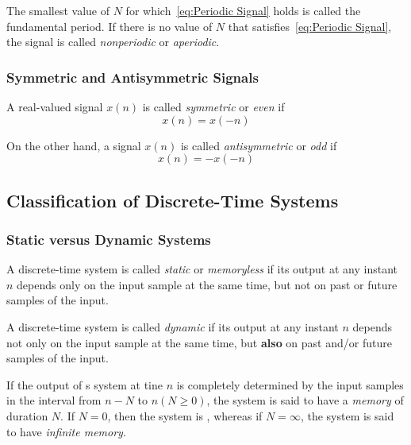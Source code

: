The smallest value of $N$ for which~\eqref{eq:Periodic Signal} holds is called the fundamental period.
If there is no value of $N$ that satisfies~\eqref{eq:Periodic Signal}, the signal is called \emph{nonperiodic} or \emph{aperiodic}.

\subsubsection{Symmetric and Antisymmetric Signals}\label{subsubsec:Symmetric and Antisymmetric Signals}
A real-valued signal $x(n)$ is called \emph{symmetric} or \emph{even} if
\begin{equation}\label{eq:Symmetric Signal}
  x(n) = x(-n)
\end{equation}

On the other hand, a signal $x(n)$ is called \emph{antisymmetric} or \emph{odd} if
\begin{equation}\label{eq:Asymmetric Signal}
  x(n) = -x(-n)
\end{equation}


\subsection{Classification of Discrete-Time Systems}\label{subsec:Classification_Discrete-Time_Systems}
\subsubsection{Static versus Dynamic Systems}\label{subsubsec:Static_vs_Dynamic_Systems}
\begin{definition}[Static]\label{def:Static}
  A discrete-time system is called \emph{static} or \emph{memoryless} if its output at any instant $n$ depends only on the input sample at the same time, but not on past or future samples of the input.
\end{definition}

\begin{definition}[Dynamic]\label{def:Dynamic}
  A discrete-time system is called \emph{dynamic} if its output at any instant $n$ depends not only on the input sample at the same time, but \textbf{also} on past and/or future samples of the input.

  If the output of s system at tine $n$ is completely determined by the input samples in the interval from $n-N$ to $n(N\geq 0)$, the system is said to have a \emph{memory} of duration $N$.
  If $N=0$, then the system is , whereas if $N=\infty$, the system is said to have \emph{infinite memory}.
\end{definition}

